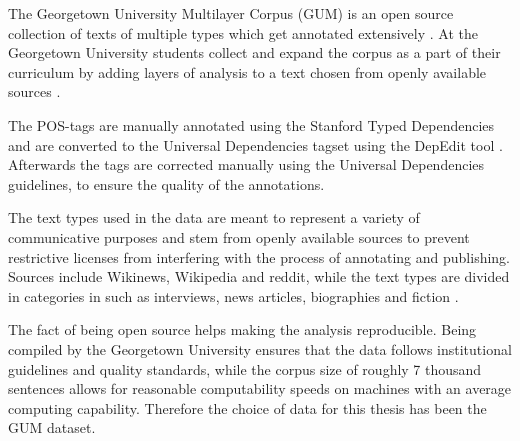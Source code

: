 The Georgetown University Multilayer Corpus (GUM) is an open source collection of texts of multiple types which get annotated extensively \citep{ud2022opencom}. At the Georgetown University students collect and expand the corpus as a part of their curriculum by adding layers of analysis to a text chosen from openly available sources \citep{Zeldes2017}.

The POS-tags are manually annotated using the Stanford Typed Dependencies \citep{de2008stanford} and are converted to the Universal Dependencies tagset using the DepEdit tool \citep{ud2022opencom}. Afterwards the tags are corrected manually using the Universal Dependencies guidelines, to ensure the quality of the annotations.

The text types used in the data are meant to represent a variety of communicative purposes and stem from openly available sources to prevent restrictive licenses from interfering with the process of annotating and publishing.
Sources include Wikinews, Wikipedia and reddit, while the text types are divided in categories in such as interviews, news articles, biographies and fiction \citep{Zeldes2017}.

The fact of being open source helps making the analysis reproducible. Being compiled by the Georgetown University ensures that the data follows institutional guidelines and quality standards, while the corpus size of roughly 7 thousand sentences allows for reasonable computability speeds on machines with an average computing capability. Therefore the choice of data for this thesis has been the GUM dataset.